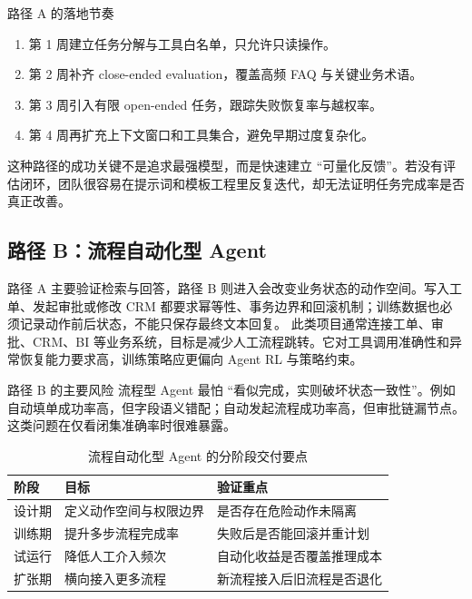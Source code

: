 \documentclass[a4paper]{article}
\begin{document}
\begin{knowledgebox}{路径 A 的落地节奏}
\begin{enumerate}
    \item 第 1 周建立任务分解与工具白名单，只允许只读操作。
    \item 第 2 周补齐 close-ended evaluation，覆盖高频 FAQ 与关键业务术语。
    \item 第 3 周引入有限 open-ended 任务，跟踪失败恢复率与越权率。
    \item 第 4 周再扩充上下文窗口和工具集合，避免早期过度复杂化。
\end{enumerate}
\end{knowledgebox}

这种路径的成功关键不是追求最强模型，而是快速建立 ``可量化反馈''。若没有评估闭环，团队很容易在提示词和模板工程里反复迭代，却无法证明任务完成率是否真正改善。

\subsection{路径 B：流程自动化型 Agent}
路径 A 主要验证检索与回答，路径 B 则进入会改变业务状态的动作空间。写入工单、发起审批或修改 CRM 都要求幂等性、事务边界和回滚机制；训练数据也必须记录动作前后状态，不能只保存最终文本回复。
此类项目通常连接工单、审批、CRM、BI 等业务系统，目标是减少人工流程跳转。它对工具调用准确性和异常恢复能力要求高，训练策略应更偏向 Agent RL 与策略约束。

\begin{importantbox}{路径 B 的主要风险}
流程型 Agent 最怕 ``看似完成，实则破坏状态一致性''。例如自动填单成功率高，但字段语义错配；自动发起流程成功率高，但审批链漏节点。这类问题在仅看闭集准确率时很难暴露。
\end{importantbox}

\begin{table}[H]
\centering
\begin{tabular}{p{2.6cm}p{4.2cm}p{4.8cm}}
\toprule
\textbf{阶段} & \textbf{目标} & \textbf{验证重点} \\
\midrule
设计期 & 定义动作空间与权限边界 & 是否存在危险动作未隔离 \\
训练期 & 提升多步流程完成率 & 失败后是否能回滚并重计划 \\
试运行 & 降低人工介入频次 & 自动化收益是否覆盖推理成本 \\
扩张期 & 横向接入更多流程 & 新流程接入后旧流程是否退化 \\
\bottomrule
\end{tabular}
\caption{流程自动化型 Agent 的分阶段交付要点}
\end{table}
\end{document}
